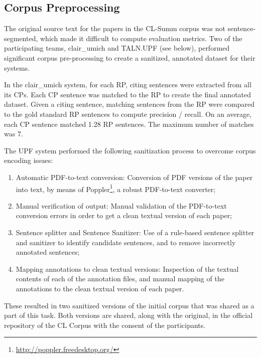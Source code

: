 \documentclass[11pt]{article}
\begin{document}
\subsection{Corpus Preprocessing}
The original source text for the papers in the CL-Summ corpus was not
sentence-segmented, which made it difficult to compute evaluation
metrics. Two of the participating teams, clair\_umich and TALN.UPF (see below),
performed significant corpus pre-processing to create a sanitized,
annotated dataset for their systems.

In the clair\_umich system, for each RP, citing sentences were
extracted from all its CPs.  Each CP sentence was matched to the RP to
create the final annotated dataset. Given a citing sentence, matching
sentences from the RP were compared to the gold standard RP sentences
to compute precision / recall.  On an average, each CP sentence
matched 1.28 RP sentences. The maximum number of matches was 7.

The UPF system performed the following sanitization process to
overcome corpus encoding issues:

\begin{enumerate}
\vspace{-.3cm}
\item {Automatic PDF-to-text conversion}: Conversion of PDF versions
  of the paper into text, by means of
  Poppler\footnote{\url{http://poppler.freedesktop.org/}}, a robust
  PDF-to-text converter;
\vspace{-.3cm}
\item {Manual verification of output}: Manual validation of the
  PDF-to-text conversion errors in order to get a clean textual
  version of each paper;
\vspace{-.6cm}
\item {Sentence splitter and Sentence Sanitizer}: Use of a rule-based
  sentence splitter and sanitizer to identify candidate sentences, and
  to remove incorrectly annotated sentences;
\vspace{-.3cm}
\item {Mapping annotations to clean textual versions}: Inspection of
  the textual contents of each of the annotation files, and manual
  mapping of the annotations to the clean textual version of each
  paper.
\end{enumerate}

These resulted in two sanitized versions of the initial corpus that
was shared as a part of this task. Both versions are shared, along
with the original, in the official repository of the CL Corpus with
the consent of the participants.
\end{document}
